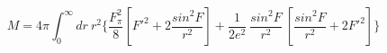 \begin{equation}
M= 4\pi \int_0^\infty dr~r^2\{ \frac{F_\pi^2}{8} [ F'^2 +2\frac{sin^2F}{r^2} ] +\frac{1}{2e^2} ~\frac{sin^2F}{r^2}~[\frac{sin^2F}{r^2} + 2F'^2]\}   \label{eq:M}
\end{equation}

